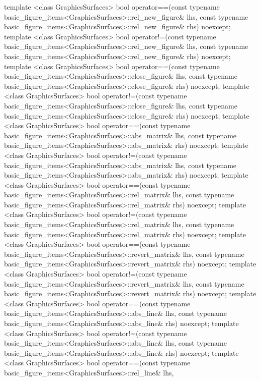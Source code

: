\begin{codeblock}
{  template <class GraphicsSurfaces>
  bool operator==(const typename basic_figure_items<GraphicsSurfaces>::rel_new_figure& lhs,
    const typename basic_figure_items<GraphicsSurfaces>::rel_new_figure& rhs) noexcept;
  template <class GraphicsSurfaces>
  bool operator!=(const typename basic_figure_items<GraphicsSurfaces>::rel_new_figure& lhs,
    const typename basic_figure_items<GraphicsSurfaces>::rel_new_figure& rhs) noexcept;
  template <class GraphicsSurfaces>
  bool operator==(const typename basic_figure_items<GraphicsSurfaces>::close_figure& lhs,
    const typename basic_figure_items<GraphicsSurfaces>::close_figure& rhs) noexcept;
  template <class GraphicsSurfaces>
  bool operator!=(const typename basic_figure_items<GraphicsSurfaces>::close_figure& lhs,
    const typename basic_figure_items<GraphicsSurfaces>::close_figure& rhs) noexcept;
  template <class GraphicsSurfaces>
  bool operator==(const typename basic_figure_items<GraphicsSurfaces>::abs_matrix& lhs,
    const typename basic_figure_items<GraphicsSurfaces>::abs_matrix& rhs) noexcept;
  template <class GraphicsSurfaces>
  bool operator!=(const typename basic_figure_items<GraphicsSurfaces>::abs_matrix& lhs,
    const typename basic_figure_items<GraphicsSurfaces>::abs_matrix& rhs) noexcept;
  template <class GraphicsSurfaces>
  bool operator==(const typename basic_figure_items<GraphicsSurfaces>::rel_matrix& lhs,
    const typename basic_figure_items<GraphicsSurfaces>::rel_matrix& rhs) noexcept;
  template <class GraphicsSurfaces>
  bool operator!=(const typename basic_figure_items<GraphicsSurfaces>::rel_matrix& lhs,
    const typename basic_figure_items<GraphicsSurfaces>::rel_matrix& rhs) noexcept;
  template <class GraphicsSurfaces>
  bool operator==(const typename basic_figure_items<GraphicsSurfaces>::revert_matrix& lhs,
    const typename basic_figure_items<GraphicsSurfaces>::revert_matrix& rhs) noexcept;
  template <class GraphicsSurfaces>
  bool operator!=(const typename basic_figure_items<GraphicsSurfaces>::revert_matrix& lhs,
    const typename basic_figure_items<GraphicsSurfaces>::revert_matrix& rhs) noexcept;
  template <class GraphicsSurfaces>
  bool operator==(const typename basic_figure_items<GraphicsSurfaces>::abs_line& lhs,
    const typename basic_figure_items<GraphicsSurfaces>::abs_line& rhs) noexcept;
  template <class GraphicsSurfaces>
  bool operator!=(const typename basic_figure_items<GraphicsSurfaces>::abs_line& lhs,
    const typename basic_figure_items<GraphicsSurfaces>::abs_line& rhs) noexcept;
  template <class GraphicsSurfaces>
  bool operator==(const typename basic_figure_items<GraphicsSurfaces>::rel_line& lhs,
}
\end{codeblock}
